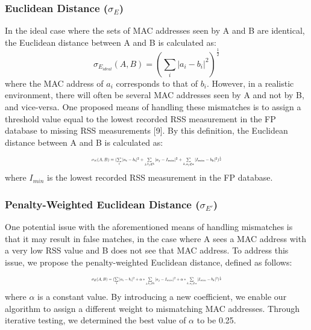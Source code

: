 \documentclass[twoside]{article}
\begin{document}
\begin{multicols}{2}
\subsubsection{Euclidean Distance ($\sigma_E$)}

\indent In the ideal case where the sets of MAC addresses seen by A and B are identical, the Euclidean distance between A and B is calculated as:
\begin{equation}
\label{euclidean_ideal}
\sigma_{E_{ideal}}(A, B) = (\sum\limits_{i}|a_i - b_i|^2)^\frac{1}{2}
\end{equation}
\indent where the MAC address of $a_i$ corresponds to that of $b_i$. However, in a realistic environment, there will often be several MAC addresses seen by A and not by B, and vice-versa. One proposed means of handling these mismatches is to assign a threshold value equal to the lowest recorded RSS measurement in the FP database to missing RSS measurements [9]. By this definition, the Euclidean distance between A and B is calculated as:
\begin{equation}
\label{euclidean}
\resizebox{0.45\textwidth}{!}{$\sigma_{E}(A, B)=(\sum\limits_{i}|a_i-b_i|^2+\sum\limits_{j, b_j\notin b}|a_j-I_{min}|^2+\sum\limits_{k, a_j\notin a}|I_{min}-b_k|^2)^\frac{1}{2}$}
\end{equation}
\indent where $I_{min}$ is the lowest recorded RSS measurement in the FP database.
	
\subsubsection{Penalty-Weighted Euclidean Distance ($\sigma_{E'}$)}
\indent One potential issue with the aforementioned means of handling mismatches is that it may result in false matches, in the case where A sees a MAC address with a very low RSS value and B does not see that MAC address. To address this issue, we propose the penalty-weighted Euclidean distance, defined as follows:
\begin{equation}
\label{euclidean_pw}
\resizebox{0.45\textwidth}{!}{$\sigma_{E}(A, B)=(\sum\limits_{i}|a_i-b_i|^2+\alpha*\sum\limits_{j, b_j\notin b}|a_j-I_{min}|^2+\alpha*\sum\limits_{k, a_j\notin a}|I_{min}-b_k|^2)^\frac{1}{2}$}
\end{equation}
\indent where $\alpha$ is a constant value. By introducing a new coefficient, we enable our algorithm to assign a different weight to mismatching MAC addresses.  Through iterative testing, we determined the best value of $\alpha$ to be 0.25.
	

\end{multicols}
\end{document}
